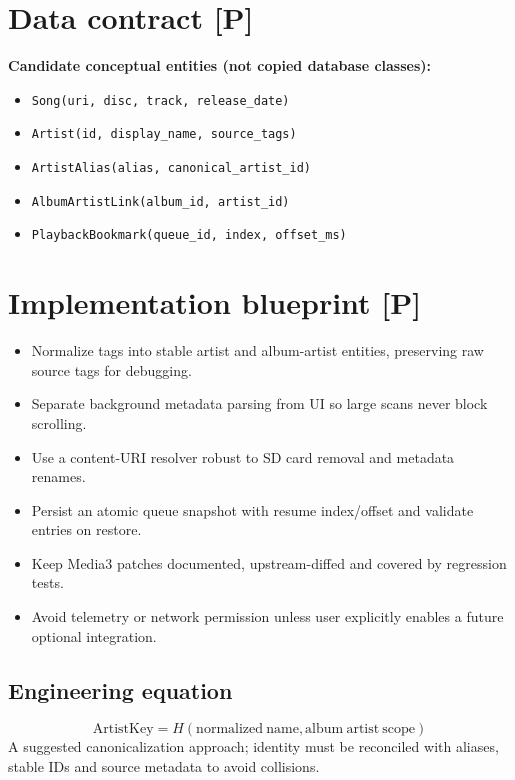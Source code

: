 \documentclass[10pt,a4paper,oneside]{report}
\begin{document}
\section{Data contract [P]}
\begin{evidencebox}\small\textbf{Candidate conceptual entities (not copied database classes):}\par
\begin{itemize}[leftmargin=*,itemsep=1pt,topsep=2pt]
\item \texttt{Song(uri, disc, track, release\_date)}
\item \texttt{Artist(id, display\_name, source\_tags)}
\item \texttt{ArtistAlias(alias, canonical\_artist\_id)}
\item \texttt{AlbumArtistLink(album\_id, artist\_id)}
\item \texttt{PlaybackBookmark(queue\_id, index, offset\_ms)}
\end{itemize}\end{evidencebox}
\section{Implementation blueprint [P]}
\begin{itemize}[leftmargin=*,itemsep=2pt,topsep=3pt]
\item Normalize tags into stable artist and album-artist entities, preserving raw source tags for debugging.
\item Separate background metadata parsing from UI so large scans never block scrolling.
\item Use a content-URI resolver robust to SD card removal and metadata renames.
\item Persist an atomic queue snapshot with resume index/offset and validate entries on restore.
\item Keep Media3 patches documented, upstream-diffed and covered by regression tests.
\item Avoid telemetry or network permission unless user explicitly enables a future optional integration.
\end{itemize}
\subsection*{Engineering equation}
\begin{equation*}\mathrm{ArtistKey}=H(\mathrm{normalized\ name},\mathrm{album\ artist\ scope})\end{equation*}
A suggested canonicalization approach; identity must be reconciled with aliases, stable IDs and source metadata to avoid collisions.\par
\end{document}
